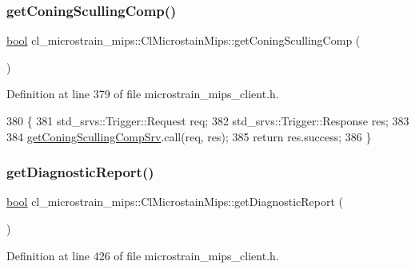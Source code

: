 \subsubsection{\texorpdfstring{get\+Coning\+Sculling\+Comp()}{getConingScullingComp()}}
{\footnotesize\ttfamily \hyperlink{classbool}{bool} cl\+\_\+microstrain\+\_\+mips\+::\+Cl\+Microstain\+Mips\+::get\+Coning\+Sculling\+Comp (\begin{DoxyParamCaption}{ }\end{DoxyParamCaption})\hspace{0.3cm}{\ttfamily [inline]}}



Definition at line 379 of file microstrain\+\_\+mips\+\_\+client.\+h.


\begin{DoxyCode}
380     \{
381         std\_srvs::Trigger::Request req;
382         std\_srvs::Trigger::Response res;
383 
384         \hyperlink{classcl__microstrain__mips_1_1ClMicrostainMips_a877393b5cf4c313e0e433e9c92163265}{getConingScullingCompSrv}.call(req, res);
385         \textcolor{keywordflow}{return} res.success;
386     \}
\end{DoxyCode}
\mbox{\label{classcl__microstrain__mips_1_1ClMicrostainMips_adbe8f64e2f6e4d48cd0efc84924b4d08}} 
\subsubsection{\texorpdfstring{get\+Diagnostic\+Report()}{getDiagnosticReport()}}
{\footnotesize\ttfamily \hyperlink{classbool}{bool} cl\+\_\+microstrain\+\_\+mips\+::\+Cl\+Microstain\+Mips\+::get\+Diagnostic\+Report (\begin{DoxyParamCaption}{ }\end{DoxyParamCaption})\hspace{0.3cm}{\ttfamily [inline]}}



Definition at line 426 of file microstrain\+\_\+mips\+\_\+client.\+h.


